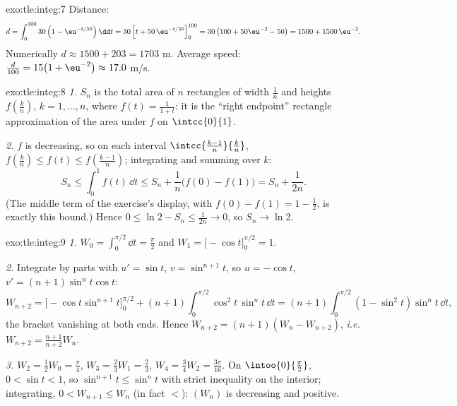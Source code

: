 \begin{solution}{exo:tle:integ:7}
Distance:
\[
d = \int_0^{100} 30\left(1 - \eu^{-t/50}\right)\dd t
= 30\left[t + 50\,\eu^{-t/50}\right]_0^{100}
= 30\left(100 + 50\eu^{-2} - 50\right)
= 1500 + 1500\,\eu^{-2}.
\]
Numerically $d \approx 1500 + 203 = 1703$ m. Average speed:
$\frac{d}{100} = 15\bigl(1 + \eu^{-2}\bigr) \approx 17.0$ m/s.
\end{solution}

\begin{solution}{exo:tle:integ:8}
\emph{1.} $S_n$ is the total area of $n$ rectangles of width $\frac1n$ and
heights $f\left(\frac kn\right)$, $k = 1, \dots, n$, where
$f(t) = \frac{1}{1+t}$: it is the ``right endpoint'' rectangle approximation
of the area under $f$ on $\intcc{0}{1}$.

\emph{2.} $f$ is decreasing, so on each interval
$\intcc{\frac{k-1}{n}}{\frac kn}$,
$f\left(\frac kn\right) \leq f(t) \leq f\left(\frac{k-1}{n}\right)$;
integrating and summing over $k$:
\[
S_n \leq \int_0^1 f(t)\,\dd t \leq S_n + \frac1n\bigl(f(0) - f(1)\bigr)
= S_n + \frac{1}{2n}.
\]
(The middle term of the exercise's display, with
$f(0) - f(1) = 1 - \frac12$, is exactly this bound.) Hence
$0 \leq \ln 2 - S_n \leq \frac{1}{2n} \to 0$, so $S_n \to \ln 2$.
\end{solution}

\begin{solution}{exo:tle:integ:9}
\emph{1.} $W_0 = \int_0^{\pi/2} \dd t = \frac{\pi}{2}$ and
$W_1 = \bigl[-\cos t\bigr]_0^{\pi/2} = 1$.

\emph{2.} Integrate by parts with $u' = \sin t$, $v = \sin^{n+1} t$, so
$u = -\cos t$, $v' = (n+1)\sin^n t \cos t$:
\[
W_{n+2} = \bigl[-\cos t \sin^{n+1} t\bigr]_0^{\pi/2}
+ (n+1)\int_0^{\pi/2} \cos^2 t\,\sin^n t\,\dd t
= (n+1)\int_0^{\pi/2} (1 - \sin^2 t)\sin^n t\,\dd t,
\]
the bracket vanishing at both ends. Hence
$W_{n+2} = (n+1)(W_n - W_{n+2})$, \emph{i.e.}
$W_{n+2} = \frac{n+1}{n+2} W_n$.

\emph{3.} $W_2 = \frac12 W_0 = \frac{\pi}{4}$,
$W_3 = \frac23 W_1 = \frac23$,
$W_4 = \frac34 W_2 = \frac{3\pi}{16}$.
On $\intoo{0}{\frac\pi2}$, $0 < \sin t < 1$, so
$\sin^{n+1} t \leq \sin^n t$ with strict inequality on the interior;
integrating, $0 < W_{n+1} \leq W_n$ (in fact $<$): $(W_n)$ is decreasing and
positive.
\end{solution}
